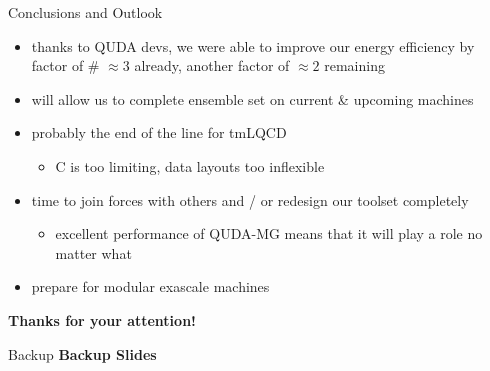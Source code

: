 \documentclass[xcolor={dvipsnames,table}]{beamer}
\begin{document}
\begin{frame}{Conclusions and Outlook}
  \begin{itemize}
    \item thanks to QUDA devs, we were able to improve our energy efficiency by factor of \# $\approx 3$ already, another factor of $\approx2$ remaining  
    \vspace{0.2cm}
    \item will allow us to complete ensemble set on current \& upcoming machines
    \vspace{0.2cm}
    \item probably the end of the line for tmLQCD
    \begin{itemize}
      \item C is too limiting, data layouts too inflexible 
    \end{itemize}
    \vspace{0.2cm}
    \item time to join forces with others and / or redesign our toolset completely
    \begin{itemize}
      \item excellent performance of QUDA-MG means that it will play a role no matter what
    \end{itemize}
    \vspace{0.2cm}
    \item prepare for modular exascale machines
  \end{itemize}
  \centering
  \vspace{1.0cm}
  \textbf{Thanks for your attention!}

\end{frame}

\backupbegin

\begin{frame}{Backup}
  \centering
  \vspace{1.0cm}
  \textbf{Backup Slides}
\end{frame}
\end{document}
